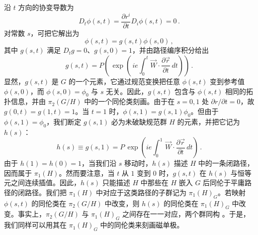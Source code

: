 沿 $t$ 方向的协变导数为
$$
D_t \phi(s,t) =\frac{\partial r^i}{\partial t}D_i \phi(s,t)=0\,.
$$
对常数 $s$，可把它解出为
$$
\phi(s,t)=g(s,t)\phi(s,0)\,, 
$$
其中 $g(s,t)$ 满足 $D_t g=0$、$g(s,0)=1$，并由路径编序积分给出
\begin{equation}
g (s,t) =  P\left(\,\exp \left(\,ie\int^{t}_{0}
\vec{W}\cdot\frac{\partial \vec{r}}{\partial t} \, dt\right)\right)\,. 
\label{LVIII}
\end{equation}
显然，$g(s,t)$ 是 $G$ 的一个元素，它通过规范变换把任意 $\phi(s,t)$ 变到参考值 $\phi(s,0)$，而 $\phi(s,0)=\phi_0$ 与 $s$ 无关。因此，$g(s,t)$ 包含与 $\phi(s,t)$ 相同的拓扑信息，并由 $\pi_2(G/H)$ 中的一个同伦类刻画。由于在 $s=0,1$ 处 $\partial r/ \partial t =0$，故 $g(0,t)=g(1,t)=1$。当 $t=1$ 时，$\phi(s,1)=g(s,1)\phi_0$。但由于 $\phi(s,1)=\phi_0$，我们断定 $g(s,1)$ 必为未破缺规范群 $H$ 的元素，并把它记为 $h(s)$：
\begin{equation}
h(s)\equiv g(s,1)=P\,\exp\left(ie\int^1_0\,\vec{W}\cdot\frac{\partial
\vec{r}}{\partial t}\,dt\right)\,. 
\label{LIX}
\end{equation}
由于 $h(1)=h(0)=1$，当我们沿 $s$ 移动时，$h(s)$ 描述 $H$ 中的一条闭路径，因而属于 $\pi_1(H)$。然而要注意，当 $t$ 从 $1$ 变到 $0$ 时，$g(s,t)$ 在 $h(s)$ 与恒等元之间连续插值。因此，$h(s)$ 只能描述 $H$ 中那些在 $H$ 嵌入 $G$ 后同伦于平庸路径的闭路径。我们把 $\pi_1(H)$ 中对应于这类路径的子群记为 $\pi_1(H)_G$。若映射 $\phi(s,t)$ 的同伦类在 $\pi_2(G/H)$ 中改变，则 $h(s)$ 的同伦类在 $\pi_1(H)_G$ 中改变。事实上，$\pi_2(G/H)$ 与 $\pi_1(H)_G$ 之间存在一一对应，两个群同构 \cite{coleman1}。于是，我们同样可以用其在 $\pi_1(H)_G$ 中的同伦类来刻画磁单极。

